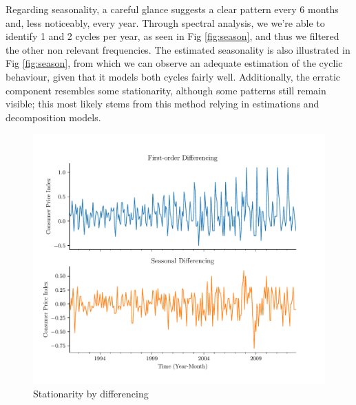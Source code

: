 \documentclass[conference]{IEEEtran}
\begin{document}
Regarding seasonality, a careful glance suggests a clear pattern every 6 months and, less noticeably, every year. Through spectral analysis, we we're able to identify 1 and 2 cycles per year, as seen in Fig \ref{fig:season}, and thus we filtered the other non relevant frequencies. The estimated seasonality is also illustrated in Fig \ref{fig:season}, from which we can observe an adequate estimation of the cyclic behaviour, given that it models both cycles fairly well. Additionally, the erratic component resembles some stationarity, although some patterns still remain visible; this most likely stems from this method relying in estimations and decomposition models.

\begin{figure}[hbtp]
    \centering
    \includegraphics[scale=0.7]{../figs/differencing.pdf}
    \caption{Stationarity by differencing}
    \label{fig:differencing}
\end{figure}
\end{document}
